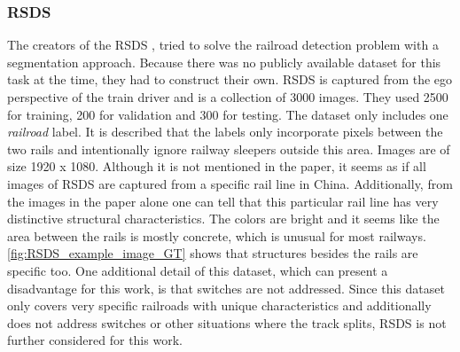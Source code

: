 \subsubsection{RSDS}
The creators of the \ac{RSDS} \cite{railNet2019}, tried to solve the railroad detection problem with a segmentation approach. Because there was no publicly available dataset for this task at the time, they had to construct their own. \ac{RSDS} is captured from the ego perspective of the train driver and is a collection of 3000 images. They used 2500 for training, 200 for validation and 300 for testing. The dataset only includes one \textit{railroad} label. It is described that the labels only incorporate pixels between the two rails and intentionally ignore railway sleepers outside this area. Images are of size 1920 x 1080.
Although it is not mentioned in the paper, it seems as if all images of \ac{RSDS} are captured from a specific rail line in China. Additionally, from the images in the paper alone one can tell that this particular rail line has very distinctive structural characteristics. The colors are bright and it seems like the area between the rails is mostly concrete, which is unusual for most railways. \ref{fig:RSDS_example_image_GT} shows that structures besides the rails are specific too.
One additional detail of this dataset, which can present a disadvantage for this work, is that switches are not addressed.
Since this dataset only covers very specific railroads with unique characteristics and additionally does not address switches or other situations where the track splits, \ac{RSDS} is not further considered for this work.

